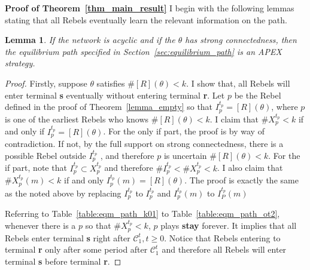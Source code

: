 \documentclass[12pt,letter]{article}
\newcommand{\Kappa}{\mathcal{C}}
\newtheorem{lemma}{Lemma}[section]
\theoremstyle{definition}
\theoremstyle{remark}
\theoremstyle{claim}
\begin{document}
\bigskip
\noindent\textbf{Proof of Theorem~\ref{thm_main_result}}
I begin with the following lemmas stating that all Rebels eventually learn the relevant information on the path.
\begin{lemma}
\label{lemma:learning_on_the_path}
If the network is acyclic and if the $\theta$ has strong connectedness, then the equilibrium path specified in Section~\ref{sec:equilibrium_path} is an APEX strategy.
\end{lemma}
\begin{proof}
Firstly, suppose $\theta$ satisfies $\#[R](\theta)<k$. I show that, all Rebels will enter terminal \textbf{s} eventually without entering terminal \textbf{r}.  Let $p$ be the Rebel defined in the proof of Theorem~\ref{lemma_empty} so that $I^{t_p}_p=[R](\theta)$, where $p$ is one of the earliest Rebels who knows $\#[R](\theta)<k$. I claim that $\#X^{t_p}_p< k$ if and only if $I^{t_p}_p=[R](\theta)$. For the only if part, the proof is by way of contradiction. If not, by the full support on strong connectedness, there is a possible Rebel outside $I^{t_p}_p$ , and therefore $p$ is uncertain $\#[R](\theta)<k$. For the if part, note that $I^{t_p}_p\subset X^{t_p}_p$ and therefore $\#I^{t_p}_p< \#X^{t_p}_p<k$. I also claim that $\#X^{t_p}_p(m)<k$ if and only $I^{t_p}_p(m)=[R](\theta)$. The proof is exactly the same as the noted above by replacing $I^{t_p}_p$ to $I^{t_p}_p$ and $I^{t_p}_p(m)$ to $I^{t_p}_P(m)$

Referring to Table~\ref{table:eqm_path_k01} to Table~\ref{table:eqm_path_ot2}, whenever there is a $p$ so that $\#X^{t_p}_p<k$, $p$ plays \textbf{stay} forever. It implies that all Rebels enter terminal \textbf{s} right after $\Kappa^t_1, t\geq 0$. Notice that Rebels entering to terminal \textbf{r} only after some period after $\Kappa^t_1$ and therefore all Rebels will enter terminal \textbf{s} before terminal \textbf{r}. 


\end{proof}
\end{document}
